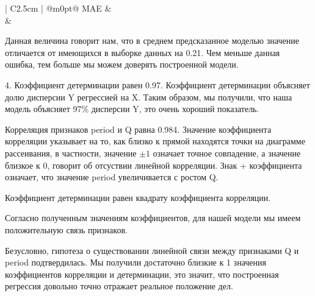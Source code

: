 \documentclass{article}
\begin{document}
\begin{center}
  \begin{tabular}{| C{2.5cm} | @{}m{0pt}@{}}
    \hline
    MAE &\\[0.5em]  &\\[0.5em]   
    \hline
  \end{tabular}
\end{center}

Данная величина говорит нам, что в среднем предсказанное моделью значение отличается от имеющихся в выборке данных на 0.21. Чем меньше данная ошибка, тем больше мы можем доверять построенной модели.

4. Коэффициент детерминации равен 0.97. Коэффициент детерминации объясняет долю дисперсии Y регрессией на X. Таким образом, мы получили, что наша модель объясняет 97\% дисперсии Y, это очень хороший показатель.

Корреляция признаков period и Q равна 0.984. Значение коэффициента корреляции указывает на то, как близко к прямой  находятся точки на диаграмме рассеивания, в частности, значение $\pm 1$ означает точное совпадение, а значение близкое к 0, говорит об отсуствии линейной корреляции. Знак + коэффициента означает, что значение period увеличивается с ростом Q. 

Коэффициент детерминации равен квадрату коэффициента корреляции.

Согласно полученным значениям коэффициентов, для нашей модели мы имеем положительную связь признаков. 

Безусловно, гипотеза о существовании линейной связи между признаками Q и period подтвердилась. Мы получили достаточно близкие к 1 значения коэффициентов корреляции и детерминации, это значит, что построенная регрессия довольно точно отражает реальное положение дел. 
\end{document}
